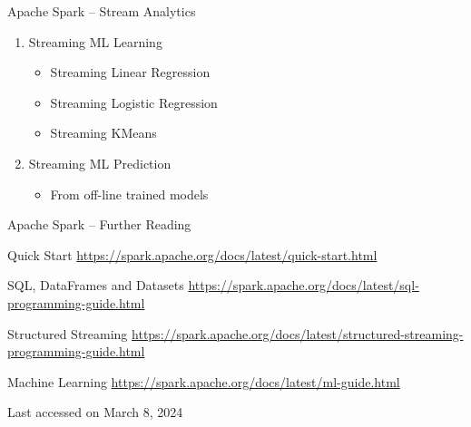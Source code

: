 \documentclass[ignorenonframetext,xcolor=x11names]{beamer}
\begin{document}
\begin{frame}[label=advanced]{Apache Spark -- Stream Analytics}
\begin{enumerate}
   \item Streaming ML Learning
   \begin{itemize}
       \item Streaming Linear Regression
       \item Streaming Logistic Regression
       \item Streaming KMeans
   \end{itemize}
   \item Streaming ML Prediction
   \begin{itemize}
       \item From off-line trained models
   \end{itemize}
\end{enumerate}
\end{frame}

\begin{frame}[label=withcode]{Apache Spark -- Further Reading}
\begin{block}{Quick Start}
\footnotesize
\url{https://spark.apache.org/docs/latest/quick-start.html}\normalsize
\end{block}

\begin{block}{SQL, DataFrames and Datasets}
\footnotesize
\url{https://spark.apache.org/docs/latest/sql-programming-guide.html}\normalsize
\end{block}

\begin{block}{Structured Streaming}
\footnotesize
\url{https://spark.apache.org/docs/latest/structured-streaming-programming-guide.html}\normalsize
\end{block}

\begin{block}{Machine Learning}
\footnotesize
\url{https://spark.apache.org/docs/latest/ml-guide.html}\normalsize
\end{block}

\scriptsize Last accessed on March 8, 2024
\end{frame}
\end{document}
